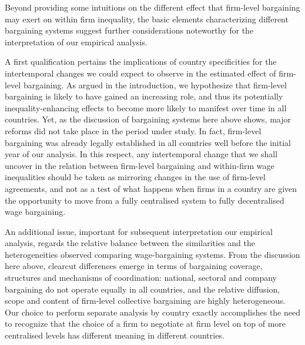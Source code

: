 \documentclass[12pt]{article}
\begin{document}
Beyond providing some intuitions on the different effect that
firm-level bargaining may exert on within firm inequality, the basic
elements characterizing different bargaining systems suggest further
considerations noteworthy for the interpretation of our empirical
analysis.

A first qualification pertains the implications of country
specificities for the intertemporal changes we could expect to observe
in the estimated effect of firm-level bargaining. As argued in the
introduction, we hypothesize that firm-level bargaining is likely to
have gained an increasing role, and thus its potentially
inequality-enhancing effects to become more likely to manifest over
time in all countries. Yet, as the discussion of bargaining systems
here above shows, major reforms did not take place in the period under
study. In fact, firm-level bargaining was already legally established
in all countries well before the initial year of our analysis. In this
respect, any intertemporal change that we shall uncover in the
relation between firm-level bargaining and within-firm wage
inequalities should be taken as mirroring changes in the use of
firm-level agreements, and not as a test of what happens when firms in
a country are given the opportunity to move from a fully centralised
system to fully decentralised wage bargaining.

An additional issue, important for subsequent interpretation our
empirical analysis, regards the relative balance between the
similarities and the heterogeneities observed comparing
wage-bargaining systems. From the discussion here above, clearcut
differences emerge in terms of bargaining coverage, structures and
mechanisms of coordination: national, sectoral and company bargaining
do not operate equally in all countries, and the relative diffusion,
scope and content of firm-level collective bargaining are highly
heterogeneous. Our choice to perform separate analysis by country
exactly accomplishes the need to recognize that the choice of a firm
to negotiate at firm level on top of more centralised levels has
different meaning in different countries.
\end{document}
